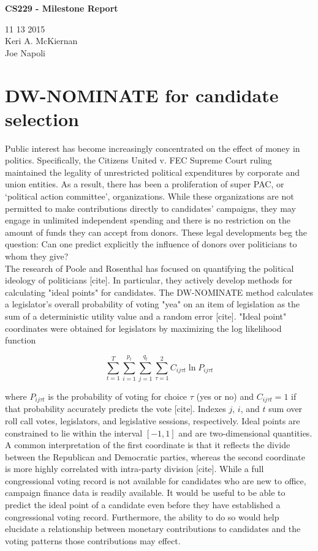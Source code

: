 \documentclass[10]{article}
\begin{document}
\begin{center}
\huge{\textbf{CS229 - Milestone Report}} \\
\end{center}
\begin{center}
\normalsize{11 13 2015} \\

Keri A. McKiernan \\
Joe Napoli
\end{center}
\section*{DW-NOMINATE for candidate selection}
Public interest has become increasingly concentrated on the effect of money in politics. Specifically, the Citizens United v. FEC Supreme Court ruling maintained the legality of unrestricted political expenditures by corporate and union entities. As a result, there has been a proliferation of super PAC, or `political action committee',  organizations. While these organizations are not permitted to make contributions directly to candidates’ campaigns, they may engage in unlimited independent spending and there is no restriction on the amount of funds they can accept from donors. These legal developments beg the question: Can one predict explicitly the influence of donors over politicians to whom they give? \\

The research of Poole and Rosenthal has focused on quantifying the political ideology of politicians [cite]. In particular, they actively develop methods for calculating "ideal points" for candidates. The DW-NOMINATE method calculates a legislator’s overall probability of voting "yea" on an item of legislation as the sum of a deterministic utility value and a random error [cite]. "Ideal point" coordinates were obtained for legislators by maximizing the log likelihood function

\[ \sum_{t=1}^{T} \sum_{i=1}^{p_t} \sum_{j=1}^{q_t} \sum_{\tau = 1}^{2} C_{ij \tau t} \ln P_{ij \tau t} \]

\noindent where $P_{ij \tau t}$ is the probability of voting for choice $\tau$ (yes or no) and $C_{ij \tau t} = 1$ if that probability accurately predicts the vote [cite]. Indexes $j$, $i$, and $t$ sum over roll call votes, legislators, and legislative sessions, respectively. Ideal points are constrained to lie within the interval $\left[ -1,1 \right]$ and are two-dimensional quantities. A common interpretation of the first coordinate is that it reflects the divide between the Republican and Democratic parties, whereas the second coordinate is more highly correlated with intra-party division [cite]. While a full congressional voting record is not available for candidates who are new to office, campaign finance data is readily available. It would be useful to be able to predict the ideal point of a candidate even before they have established a congressional voting record. Furthermore, the ability to do so would help elucidate a relationship between monetary contributions to candidates and the voting patterns those contributions may effect.\\
\end{document}
